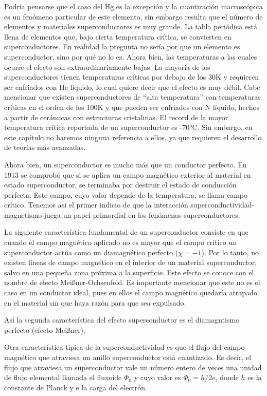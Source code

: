 Podría pensarse que el caso del Hg es la excepción y la cuantización macroscópica es un fenómeno particular de este elemento, sin embargo resulta que el número de elementos y materiales superconductores es muy grande. La tabla periódica está llena de elementos que, bajo cierta temperatura crítica, se convierten en superconductores. En realidad la pregunta no sería por que un elemento es superconductor, sino por qué no lo es. Ahora bien, las temperaturas a las cuales ocurre el efecto son extraordinariamente bajas. La mayoría de los superconductores tienen temperaturas críticas por debajo de los 30K y requieren ser enfriados con He líquido, lo cual quiere decir que el efecto es muy débil. Cabe mencionar que existen superconductores de ``alta temperatura'' con temperaturas críticas en el orden de los 100K y que pueden ser enfriados con N líquido, hechos a partir de cerámicas con estructuras cristalinas. El record de la mayor temperatura crítica reportada de un superconductor es -70°C\cite{drozdov}. Sin embargo, en este capítulo no haremos ninguna referencia a ellos, ya que requieren el desarrollo de teorías más avanzadas.

Ahora bien, un superconductor es mucho más que un conductor perfecto. En 1913 se comprobó que si se aplica un campo magnético exterior al material en estado superconductor, se terminaba por destruir el estado de conducción perfecta. Este campo, cuyo valor depende de la temperatura, se llama campo crítico. Tenemos así el primer indicio de que la interacción superconductividad-magnetismo juega un papel primordial en los fenómenos superconductores.

La siguiente característica fundamental de un superconductor consiste en que cuando el campo magnético aplicado no es mayor que el campo  crítico un superconductor actúa como un diamagnético perfecto ($\chi = -1$). Por lo tanto, no existen líneas de campo magnético en el interior de un material superconductor, salvo en una pequeña zona próxima a la superficie. Este efecto se conoce con el nombre de efecto Meißner-Ochsenfeld. Es importante mencionar que este no es el caso en un conductor ideal, pues en ellos el campo magnético quedaría atrapado en el material sin que haya razón para que sea expulsado.

Así la segunda característica del efecto superconductor es el diamagntismo perfecto (efecto Meißner).

Otra característica típica de la superconductividad es que el flujo del campo magnético que atraviesa un anillo superconductor está cuantizado. Es decir, el flujo que atraviesa un superconductor vale un número entero de veces una unidad de flujo elemental llamada el fluxoide $\Phi_0$ y cuyo valor es $\Phi_0 = h /2 e$, donde $h$ es la constante de Planck y e la carga del electrón.

